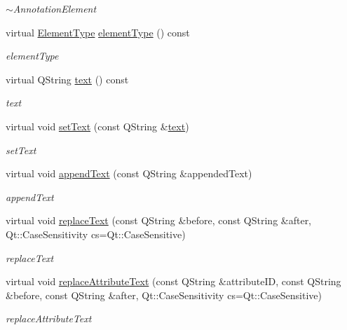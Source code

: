 \begin{DoxyCompactItemize}
\begin{DoxyCompactList}\small\item\em $\sim$\+Annotation\+Element \end{DoxyCompactList}\item 
virtual \hyperlink{class_annotation_element_af5282990ffbe25eeea8ab02037e344b0}{Element\+Type} \hyperlink{class_annotation_element_a9b2d5cf05a2f81d9b2103a5c736dfb2d}{element\+Type} () const
\begin{DoxyCompactList}\small\item\em element\+Type \end{DoxyCompactList}\item 
virtual Q\+String \hyperlink{class_annotation_element_aa59bd98501e3882990681f6aff2ee863}{text} () const
\begin{DoxyCompactList}\small\item\em text \end{DoxyCompactList}\item 
virtual void \hyperlink{class_annotation_element_a67b28559349cd0ca84d47f629ee4ee45}{set\+Text} (const Q\+String \&\hyperlink{class_annotation_element_aa59bd98501e3882990681f6aff2ee863}{text})
\begin{DoxyCompactList}\small\item\em set\+Text \end{DoxyCompactList}\item 
virtual void \hyperlink{class_annotation_element_aefb0498f0c301d7c1f04ba2d32397f7c}{append\+Text} (const Q\+String \&appended\+Text)
\begin{DoxyCompactList}\small\item\em append\+Text \end{DoxyCompactList}\item 
virtual void \hyperlink{class_annotation_element_a6ea70bff6f981c1d6014579d4c7fc680}{replace\+Text} (const Q\+String \&before, const Q\+String \&after, Qt\+::\+Case\+Sensitivity cs=Qt\+::\+Case\+Sensitive)
\begin{DoxyCompactList}\small\item\em replace\+Text \end{DoxyCompactList}\item 
virtual void \hyperlink{class_annotation_element_aafa5f3ee2d42db969bafb453e16c35b3}{replace\+Attribute\+Text} (const Q\+String \&attribute\+ID, const Q\+String \&before, const Q\+String \&after, Qt\+::\+Case\+Sensitivity cs=Qt\+::\+Case\+Sensitive)
\begin{DoxyCompactList}\small\item\em replace\+Attribute\+Text \end{DoxyCompactList}\item 

\end{DoxyCompactItemize}
